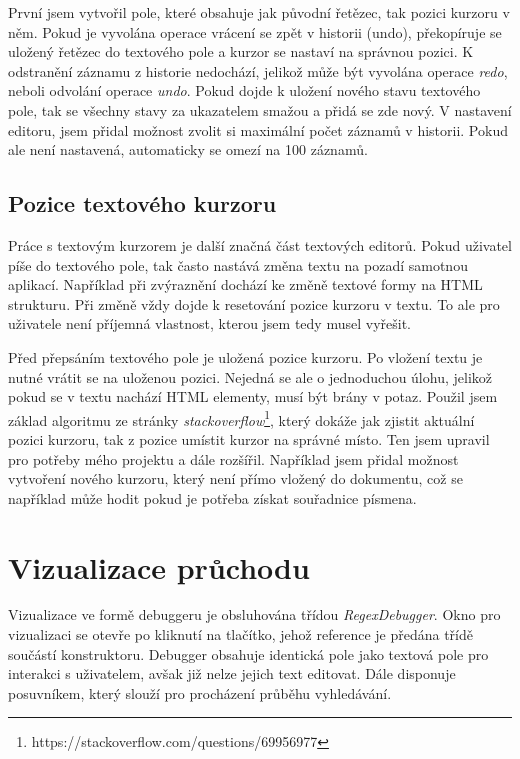 První jsem vytvořil pole, které obsahuje jak původní řetězec, tak pozici kurzoru v něm.
Pokud je vyvolána operace vrácení se zpět v historii (undo), překopíruje se uložený řetězec do textového pole a kurzor se nastaví na správnou pozici.
K odstranění záznamu z historie nedochází, jelikož může být vyvolána operace \textit{redo}, neboli odvolání operace \textit{undo}.
Pokud dojde k uložení nového stavu textového pole, tak se všechny stavy za ukazatelem smažou a přidá se zde nový.
V nastavení editoru, jsem přidal možnost zvolit si maximální počet záznamů v historii.
Pokud ale není nastavená, automaticky se omezí na 100 záznamů.

\subsection*{Pozice textového kurzoru}
Práce s textovým kurzorem je další značná část textových editorů.
Pokud uživatel píše do textového pole, tak často nastává změna textu na pozadí samotnou aplikací.
Například při zvýraznění dochází ke změně textové formy na HTML strukturu.
Při změně vždy dojde k resetování pozice kurzoru v textu.
To ale pro uživatele není příjemná vlastnost, kterou jsem tedy musel vyřešit.

Před přepsáním textového pole je uložená pozice kurzoru.
Po vložení textu je nutné vrátit se na uloženou pozici. 
Nejedná se ale o jednoduchou úlohu, jelikož pokud se v textu nachází HTML elementy, musí být brány v potaz.
Použil jsem základ algoritmu ze stránky \textit{stackoverflow}\footnote{https://stackoverflow.com/questions/69956977}, který dokáže jak zjistit aktuální pozici kurzoru, tak z pozice umístit kurzor na správné místo.
Ten jsem upravil pro potřeby mého projektu a dále rozšířil.
Například jsem přidal možnost vytvoření nového kurzoru, který není přímo vložený do dokumentu, což se například může hodit pokud je potřeba získat souřadnice písmena.

\section{Vizualizace průchodu}

Vizualizace ve formě debuggeru je obsluhována třídou \textit{RegexDebugger}.
Okno pro vizualizaci se otevře po kliknutí na tlačítko, jehož reference je předána třídě součástí konstruktoru.
Debugger obsahuje identická pole jako textová pole pro interakci s uživatelem, avšak již nelze jejich text editovat.
Dále disponuje posuvníkem, který slouží pro procházení průběhu vyhledávání. 

